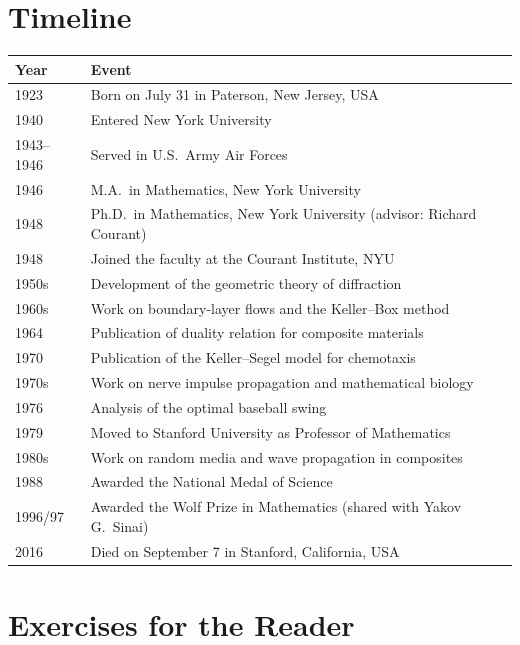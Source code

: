 \section*{Timeline}
\begin{tabularx}{\linewidth}{|p{1.5cm}|>{\raggedright\arraybackslash}X|}
\hline
\textbf{Year} & \textbf{Event} \\ \hline
1923 & Born on July 31 in Paterson, New Jersey, USA \\ \hline
1940 & Entered New York University \\ \hline
1943--1946 & Served in U.S.\ Army Air Forces \\ \hline
1946 & M.A.\ in Mathematics, New York University \\ \hline
1948 & Ph.D.\ in Mathematics, New York University (advisor: Richard Courant) \\ \hline
1948 & Joined the faculty at the Courant Institute, NYU \\ \hline
1950s & Development of the geometric theory of diffraction \\ \hline
1960s & Work on boundary-layer flows and the Keller--Box method \\ \hline
1964 & Publication of duality relation for composite materials \\ \hline
1970 & Publication of the Keller--Segel model for chemotaxis \\ \hline
1970s & Work on nerve impulse propagation and mathematical biology \\ \hline
1976 & Analysis of the optimal baseball swing \\ \hline
1979 & Moved to Stanford University as Professor of Mathematics \\ \hline
1980s & Work on random media and wave propagation in composites \\ \hline
1988 & Awarded the National Medal of Science \\ \hline
1996/97 & Awarded the Wolf Prize in Mathematics (shared with Yakov G.\ Sinai) \\ \hline
2016 & Died on September 7 in Stanford, California, USA \\ \hline
\end{tabularx}

\section*{Exercises for the Reader}

